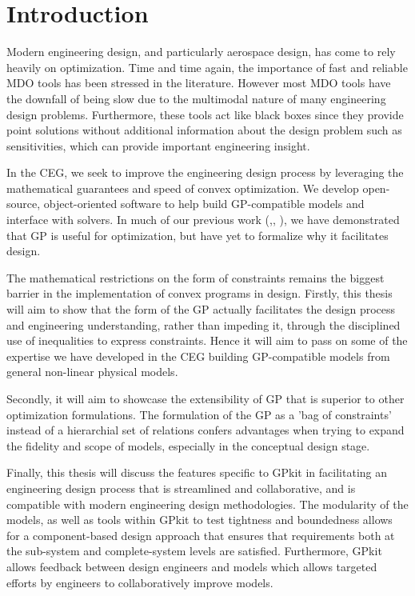 \chapter{Introduction}

Modern engineering design, and particularly aerospace design, has come to rely
heavily on optimization. Time and time again, the importance of fast and
reliable MDO tools has been stressed in the literature. However most MDO tools
have the downfall of being slow due to the multimodal nature of many
engineering design problems. Furthermore, these tools act like black boxes since
they provide point solutions without additional information about the design problem
such as sensitivities, which can provide important engineering insight.
	
In the \gls{CEG}, we seek to improve the engineering design process by
leveraging the mathematical guarantees and speed of convex optimization. We develop
open-source, object-oriented software to help build \gls{GP}-compatible models and
interface with solvers. In much of our previous work
(\cite{gp_ac_design},\cite{SP_ac_design}, \cite{sp_engine}), we have demonstrated that
\gls{GP} is useful for optimization, but have yet to formalize why it
facilitates design.
 
The mathematical restrictions on the form of constraints remains the biggest
barrier in the implementation of convex programs in design. Firstly, this thesis
will aim to show that the form of the GP actually facilitates the design process
and engineering understanding, rather than impeding it, through the disciplined use
of inequalities to express constraints. Hence it will aim to
pass on some of the expertise we have developed in the \gls{CEG} building
\gls{GP}-compatible models from general non-linear physical models. 

Secondly, it will aim to showcase the extensibility of \gls{GP} that is superior 
to other optimization formulations. The formulation of the \gls{GP} as a 'bag of 
constraints' instead of a hierarchial set of relations confers advantages 
when trying to expand the fidelity and scope of models, especially in the 
conceptual design stage. 

Finally, this thesis will discuss the features specific to GPkit in facilitating
an engineering design process that is streamlined and collaborative, and is
compatible with modern engineering design methodologies. The modularity of the 
models, as well as tools within GPkit to test tightness and boundedness
allows for a component-based design approach that ensures that
requirements both at the sub-system and complete-system levels are satisfied. 
Furthermore, GPkit allows feedback between design engineers and models
which allows targeted efforts by engineers to collaboratively improve models.


